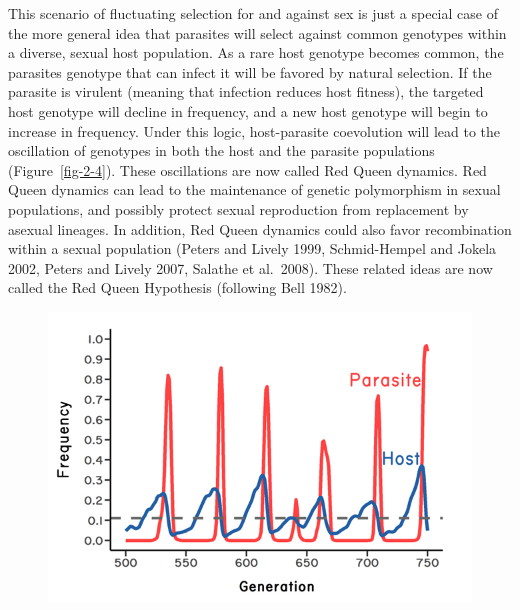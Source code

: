 \documentclass[
  letterpaper,
]{book}
\begin{document}
This scenario of fluctuating selection for and against sex is just a
special case of the more general idea that parasites will select against
common genotypes within a diverse, sexual host population. As a rare
host genotype becomes common, the parasites genotype that can infect it
will be favored by natural selection. If the parasite is virulent
(meaning that infection reduces host fitness), the targeted host
genotype will decline in frequency, and a new host genotype will begin
to increase in frequency. Under this logic, host-parasite coevolution
will lead to the oscillation of genotypes in both the host and the
parasite populations (Figure~\ref{fig-2-4}). These oscillations are now
called Red Queen dynamics. Red Queen dynamics can lead to the
maintenance of genetic polymorphism in sexual populations, and possibly
protect sexual reproduction from replacement by asexual lineages. In
addition, Red Queen dynamics could also favor recombination within a
sexual population (Peters and Lively 1999, Schmid-Hempel and Jokela
2002, Peters and Lively 2007, Salathe et al.~2008). These related ideas
are now called the Red Queen Hypothesis (following Bell 1982).

\begin{figure}


{\centering \includegraphics{images/fig2-4.jpeg}

}

\end{figure}
\end{document}
